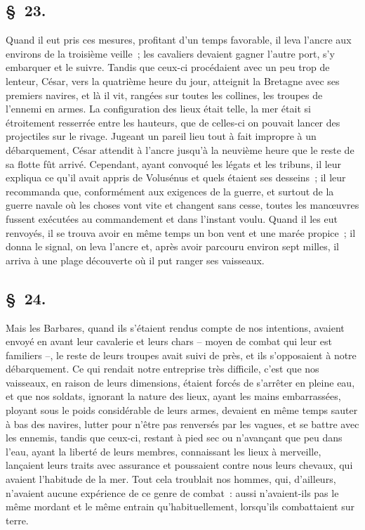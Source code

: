 \documentclass[french,twoside]{book} %
\begin{document}
\subsection[{§ 23.}]{ \textsc{§ 23.} }
\noindent Quand il eut pris ces mesures, profitant d’un temps favorable, il leva l’ancre aux environs de la troisième veille ; les cavaliers devaient gagner l’autre port, s’y embarquer et le suivre. Tandis que ceux-ci procédaient avec un peu trop de lenteur, César, vers la quatrième heure du jour, atteignit la Bretagne avec ses premiers navires, et là il vit, rangées sur toutes les collines, les troupes de l’ennemi en armes. La configuration des lieux était telle, la mer était si étroitement resserrée entre les hauteurs, que de celles-ci on pouvait lancer des projectiles sur le rivage. Jugeant un pareil lieu tout à fait impropre à un débarquement, César attendit à l’ancre jusqu’à la neuvième heure que le reste de sa flotte fût arrivé. Cependant, ayant convoqué les légats et les tribuns, il leur expliqua ce qu’il avait appris de Volusénus et quels étaient ses desseins ; il leur recommanda que, conformément aux exigences de la guerre, et surtout de la guerre navale où les choses vont vite et changent sans cesse, toutes les manœuvres fussent exécutées au commandement et dans l’instant voulu. Quand il les eut renvoyés, il se trouva avoir en même temps un bon vent et une marée propice ; il donna le signal, on leva l’ancre et, après avoir parcouru environ sept milles, il arriva à une plage découverte où il put ranger ses vaisseaux.
\subsection[{§ 24.}]{ \textsc{§ 24.} }
\noindent Mais les Barbares, quand ils s’étaient rendus compte de nos intentions, avaient envoyé en avant leur cavalerie et leurs chars – moyen de combat qui leur est familiers –, le reste de leurs troupes avait suivi de près, et ils s’opposaient à notre débarquement. Ce qui rendait notre entreprise très difficile, c’est que nos vaisseaux, en raison de leurs dimensions, étaient forcés de s’arrêter en pleine eau, et que nos soldats, ignorant la nature des lieux, ayant les mains embarrassées, ployant sous le poids considérable de leurs armes, devaient en même temps sauter à bas des navires, lutter pour n’être pas renversés par les vagues, et se battre avec les ennemis, tandis que ceux-ci, restant à pied sec ou n’avançant que peu dans l’eau, ayant la liberté de leurs membres, connaissant les lieux à merveille, lançaient leurs traits avec assurance et poussaient contre nous leurs chevaux, qui avaient l’habitude de la mer. Tout cela troublait nos hommes, qui, d’ailleurs, n’avaient aucune expérience de ce genre de combat : aussi n’avaient-ils pas le même mordant et le même entrain qu’habituellement, lorsqu’ils combattaient sur terre.
\end{document}
